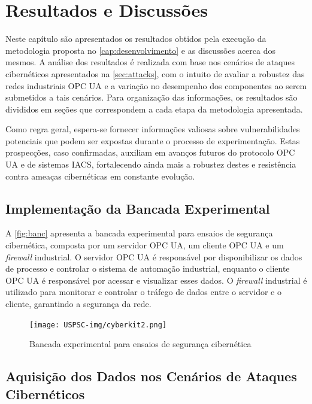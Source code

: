 \chapter{Resultados e Discussões} \label{cap:resultados}

Neste capítulo são apresentados os resultados obtidos pela execução da metodologia proposta no \autoref{cap:desenvolvimento} e as discussões acerca dos mesmos. A análise dos resultados é realizada com base nos cenários de ataques cibernéticos apresentados na \autoref{sec:attacks}, com o intuito de avaliar a robustez das redes industriais OPC UA e a variação no desempenho dos componentes ao serem submetidos a tais cenários. Para organização das informações, os resultados são divididos em seções que correspondem a cada etapa da metodologia apresentada.

Como regra geral, espera-se fornecer informações valiosas sobre vulnerabilidades potenciais que podem ser expostas durante o processo de experimentação. Estas prospecções, caso confirmadas, auxiliam em avanços futuros do protocolo OPC UA e de sistemas IACS, fortalecendo ainda mais a robustez destes e resistência contra ameaças cibernéticas em constante evolução.

\section{Implementação da Bancada Experimental} \label{sec:impl-bancada}

A \autoref{fig:banc} apresenta a bancada experimental para ensaios de segurança cibernética, composta por um servidor OPC UA, um cliente OPC UA e um \textit{firewall} industrial. O servidor OPC UA é responsável por disponibilizar os dados de processo e controlar o sistema de automação industrial, enquanto o cliente OPC UA é responsável por acessar e visualizar esses dados. O \textit{firewall} industrial é utilizado para monitorar e controlar o tráfego de dados entre o servidor e o cliente, garantindo a segurança da rede.

\begin{figure}[htbp!]
    \caption{\label{fig:banc}Bancada experimental para ensaios de segurança cibernética}
    \begin{center}
        \texttt{[image: USPSC-img/cyberkit2.png]}
    \end{center}
\end{figure}

\section{Aquisição dos Dados nos Cenários de Ataques Cibernéticos} \label{sec:exec-attacks}

